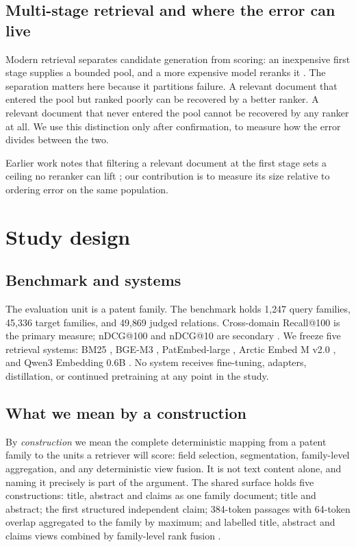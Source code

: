 \documentclass[preprint,11pt,authoryear]{elsarticle}          %
\begin{document}
\subsection{Multi-stage retrieval and where the error can live}

Modern retrieval separates candidate generation from scoring: an inexpensive first stage supplies a bounded pool, and a more expensive model reranks it \citep{asadi2013candidate,nogueira2019passage}. The separation matters here because it partitions failure. A relevant document that entered the pool but ranked poorly can be recovered by a better ranker. A relevant document that never entered the pool cannot be recovered by any ranker at all. We use this distinction only after confirmation, to measure how the error divides between the two.

Earlier work notes that filtering a relevant document at the first stage sets a ceiling no reranker can lift \citep{lee2021priorart,rathee2025guiding}; our contribution is to measure its size relative to ordering error on the same population.

\section{Study design}
\label{sec:design}

\subsection{Benchmark and systems}

The evaluation unit is a patent family. The benchmark holds 1{,}247 query families, 45{,}336 target families, and 49{,}869 judged relations. Cross-domain Recall@100 is the primary measure; nDCG@100 and nDCG@10 are secondary \citep{jarvelin2002cumulated}. We freeze five retrieval systems: BM25 \citep{robertson2009probabilistic}, BGE-M3 \citep{chen2024bgem3}, PatEmbed-large \citep{ayaou2025patenteb}, Arctic Embed M v2.0 \citep{yu2024arctic}, and Qwen3 Embedding 0.6B \citep{zhang2025qwen3}. No system receives fine-tuning, adapters, distillation, or continued pretraining at any point in the study.

\subsection{What we mean by a construction}

By \emph{construction} we mean the complete deterministic mapping from a patent family to the units a retriever will score: field selection, segmentation, family-level aggregation, and any deterministic view fusion. It is not text content alone, and naming it precisely is part of the argument. The shared surface holds five constructions: title, abstract and claims as one family document; title and abstract; the first structured independent claim; 384-token passages with 64-token overlap aggregated to the family by maximum; and labelled title, abstract and claims views combined by family-level rank fusion \citep{cormack2009rrf}.
\end{document}
